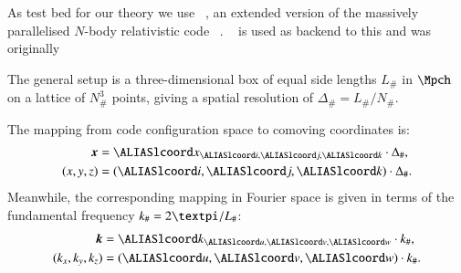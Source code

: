 







As test bed for our theory we use \gwasevolution~\citep{christiansenAsevolutionRelativisticNbody2023}, an extended version of the massively parallelised $N$-body relativistic code \gevolution~\citep{adamekGevolutionCosmologicalNbody2016}. \latfield~\citep{daverioLatfield2LibraryClassical2016} is used as backend to this and was originally \blahblah








The general setup is a three-dimensional box of equal side lengths $L_\#$ in $\Mpch$ on a lattice of $N_\#^3$ points, giving a spatial resolution of $\Delta_\#=L_\#/N_\#$. %

The mapping from code configuration space to comoving coordinates is:
\begin{equation}
    \begin{split}
        \vec{x} & = \lcoord{x}_{\lcoord{i}, \lcoord{j}, \lcoord{k}} \cdot \Delta_\# ,\\
        (x, y, z)&= (\lcoord{i}, \lcoord{j}, \lcoord{k})\cdot \Delta_\#.
    \end{split}
\end{equation}
Meanwhile, the corresponding mapping in Fourier space is given in terms of the fundamental frequency $k_\#=2\ppi/L_\#$:
\begin{equation}
    \begin{split}
        \vec{k} & = \lcoord{k}_{\lcoord{u}, \lcoord{v}, \lcoord{w}} \cdot k_\#,\\
        (k_x, k_y, k_z)&=   (\lcoord{u}, \lcoord{v}, \lcoord{w})\cdot k_\#.
    \end{split}
\end{equation}



